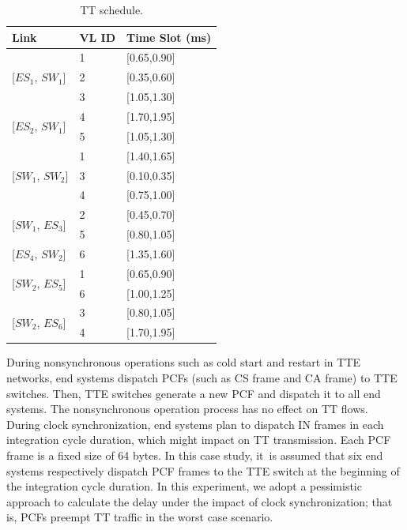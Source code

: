\documentclass[electronics,article,accept,moreauthors,pdftex]{Definitions/mdpi}
\begin{document}
        \begin{table}[H]
         \centering
\caption{TT schedule.}
        \begin{tabular}{m{1.6cm}<{\centering}m{0.9cm}<{\centering}m{2.2cm}<{\centering}}

\toprule
{\bf  Link} & {\bf VL ID} & {\bf Time Slot (ms)}\\
\midrule
\multirow{3}{*}{[$ES_1$, $SW_1$]} & 1 & [0.65,0.90]\\

& 2 & [0.35,0.60] \\

& 3 & [1.05,1.30] \\
\midrule
\multirow{2}{*}{[$ES_2$, $SW_1$]} & 4 & [1.70,1.95] \\

& 5 & [1.05,1.30]\\
\midrule
\multirow{3}{*}{[$SW_1$, $SW_2$]} & 1 & [1.40,1.65]\\

& 3 & [0.10,0.35]\\

& 4 & [0.75,1.00]\\
\midrule
\multirow{2}{*}{[$SW_1$, $ES_3$]} & 2 & [0.45,0.70]\\

& 5 & [0.80,1.05]\\
\midrule

[$ES_4$, $SW_2$] & 6 & [1.35,1.60]\\

\midrule
\multirow{2}{*}{[$SW_2$, $ES_5$]} & 1 & [0.65,0.90]\\

& 6 & [1.00,1.25]\\
\midrule
\multirow{2}{*}{[$SW_2$, $ES_6$]} & 3 & [0.80,1.05]\\

& 4 & [1.70,1.95]\\
\bottomrule
\end{tabular}
\label{tab2}
 \end{table}


During nonsynchronous operations such as cold start and restart in TTE networks, end systems dispatch PCFs (such as CS frame and CA frame) to TTE switches. Then, TTE switches generate a new PCF  and dispatch it to all end systems. The nonsynchronous operation process has no effect on TT flows. During clock synchronization, end systems plan to dispatch IN frames in each integration cycle duration, which might impact on TT transmission. Each PCF frame is a fixed size of 64 bytes. In this case study, it~is assumed that six end systems respectively dispatch PCF frames to the TTE switch at the beginning of the integration cycle duration. {In this experiment, we adopt a pessimistic approach to calculate the delay under the impact of clock synchronization; that is, PCFs preempt TT traffic in the worst case scenario.}
\end{document}
